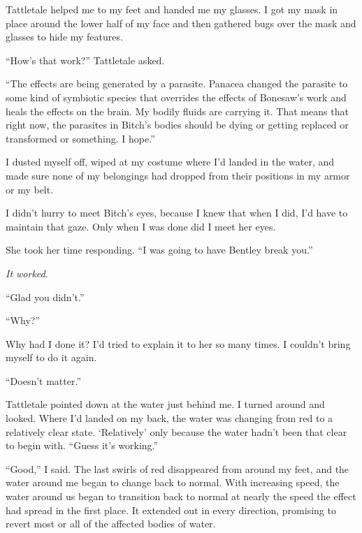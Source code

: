Tattletale helped me to my feet and handed me my glasses.  I got my mask in place around the lower half of my face and then gathered bugs over the mask and glasses to hide my features.



``How's that work?''  Tattletale asked.



``The effects are being generated by a parasite.  Panacea changed the parasite to some kind of symbiotic species that overrides the effects of Bonesaw's work and heals the effects on the brain.  My bodily fluids are carrying it.  That means that right now, the parasites in Bitch's bodies should be dying or getting replaced or transformed or something.  I hope.''



I dusted myself off, wiped at my costume where I'd landed in the water, and made sure none of my belongings had dropped from their positions in my armor or my belt.



I didn't hurry to meet Bitch's eyes, because I knew that when I did, I'd have to maintain that gaze.  Only when I was done did I meet her eyes.



She took her time responding.  ``I was going to have Bentley break you.''



\emph{It worked}.



``Glad you didn't.''



``Why?''



Why had I done it?  I'd tried to explain it to her so many times.  I couldn't bring myself to do it again.



``Doesn't matter.''



Tattletale pointed down at the water just behind me.  I turned around and looked.  Where I'd landed on my back, the water was changing from red to a relatively clear state.  `Relatively' only because the water hadn't been that clear to begin with.  ``Guess it's working.''



``Good,'' I said.  The last swirls of red disappeared from around my feet, and the water around me began to change back to normal.  With increasing speed, the water around us began to transition back to normal at nearly the speed the effect had spread in the first place.  It extended out in every direction, promising to revert most or all of the affected bodies of water.



